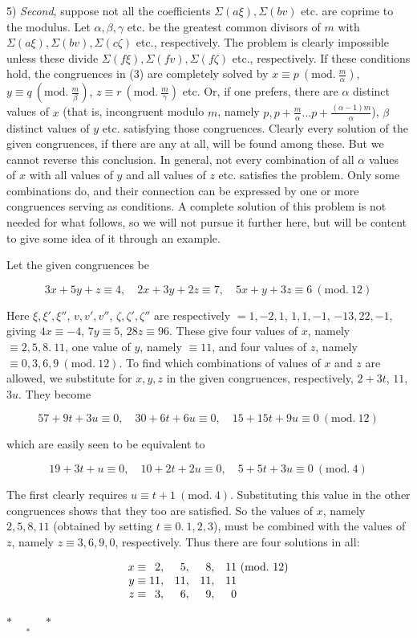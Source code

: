 5) \emph{Second}, suppose not all the coefficients $\Sigma(a\xi),\Sigma(bv)$ etc. are coprime to the modulus. Let $\alpha,\beta,\gamma$ etc. be the greatest common divisors of $m$ with $\Sigma(a\xi),\Sigma(bv),\Sigma(c\zeta)$ etc., respectively. The problem is clearly impossible unless these divide $\Sigma(f\xi),\Sigma(fv),\Sigma(f\zeta)$ etc., respectively. If these conditions hold, the congruences in (3) are completely solved by $x\equiv p\ (\mathrm{mod.}\ \frac{m}{\alpha})$, $y\equiv q\ (\mathrm{mod.}\ \frac{m}{\beta})$, $z\equiv r\ (\mathrm{mod.}\ \frac{m}{\gamma})$ etc. Or, if one prefers, there are $\alpha$ distinct values of $x$ (that is, incongruent modulo $m$, namely $p,p+\frac{m}{\alpha}\ldots p+\frac{(\alpha-1)m}{\alpha}$),
$\beta$ distinct values of $y$ etc. satisfying those congruences. Clearly every solution of the given congruences, if there are any at all, will be found among these. But we cannot reverse this conclusion. In general, not every combination of all $\alpha$ values of $x$ with all values of $y$ and all values of $z$ etc. satisfies the problem. Only some combinations do, and their connection can be expressed by one or more congruences serving as conditions. A complete solution of this problem is not needed for what follows, so we will not pursue it further here, but will be content to give some idea of it through an example.

Let the given congruences be

\[3x+5y+z\equiv4,\quad2x+3y+2z\equiv7,\quad5x+y+3z\equiv6\ (\mathrm{mod.}\ 12)\]

Here $\xi,\xi',\xi''$, $v,v',v''$, $\zeta,\zeta',\zeta''$ are respectively $=1,-2,1$, $1,1,-1$, $-13,22,-1$, giving $4x\equiv-4$, $7y\equiv5$, $28z\equiv96$. These give four values of $x$, namely $\equiv2,5,8.\ 11$, one value of $y$, namely $\equiv11$, and four values of $z$, namely $\equiv0,3,6,9\ (\mathrm{mod.}\ 12)$. To find which combinations of values of $x$ and $z$ are allowed, we substitute for $x,y,z$ in the given congruences, respectively, $2+3t$, $11$, $3u$. They become

\[57+9t+3u\equiv0,\quad30+6t+6u\equiv0,\quad15+15t+9u\equiv0\ (\mathrm{mod.}\ 12)\]

which are easily seen to be equivalent to

\[19+3t+u\equiv0,\quad10+2t+2u\equiv0,\quad5+5t+3u\equiv0\ (\mathrm{mod.}\ 4)\]

The first clearly requires $u\equiv t+1\ (\mathrm{mod.}\ 4)$. Substituting this value in the other congruences shows that they too are satisfied. So the values of $x$, namely $2,5,8,11$ (obtained by setting $t\equiv0.\ 1,2,3$), must be combined with the values of $z$, namely $z\equiv3,6,9,0$, respectively. Thus there are four solutions in all:

\[\begin{array}{r@{\;}r@{,\quad}r@{,\quad}r@{,\quad}r@{\ }l}
x\equiv&2&5&8&11&(\mathrm{mod.}\ 12)\\
y\equiv&11&11&11&11&\\
z\equiv&3&6&9&0&
\end{array}\]

\begin{center}$\ast\quad\underset{\ast}{\phantom{\ast}}\quad\ast$\end{center}
